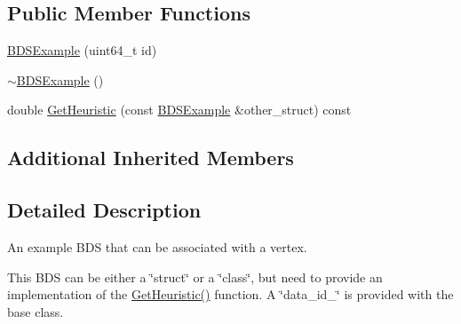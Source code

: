 \subsection*{Public Member Functions}
\begin{DoxyCompactItemize}
\item 
\hyperlink{structsrcl__ctrl_1_1BDSExample_ac344c474a50f9882e6fa12f602aec241}{B\-D\-S\-Example} (uint64\-\_\-t id)
\item 
\hyperlink{structsrcl__ctrl_1_1BDSExample_a6c3765ec76186f863979abf4c0d30f6d}{$\sim$\-B\-D\-S\-Example} ()
\item 
double \hyperlink{structsrcl__ctrl_1_1BDSExample_acb343c43c2051b085e65c4e9b12bce1e}{Get\-Heuristic} (const \hyperlink{structsrcl__ctrl_1_1BDSExample}{B\-D\-S\-Example} \&other\-\_\-struct) const 
\end{DoxyCompactItemize}
\subsection*{Additional Inherited Members}


\subsection{Detailed Description}
An example B\-D\-S that can be associated with a vertex. 

This B\-D\-S can be either a \char`\"{}struct\char`\"{} or a \char`\"{}class\char`\"{}, but need to provide an implementation of the \hyperlink{structsrcl__ctrl_1_1BDSExample_acb343c43c2051b085e65c4e9b12bce1e}{Get\-Heuristic()} function. A \char`\"{}data\-\_\-id\-\_\-\char`\"{} is provided with the base class. 


